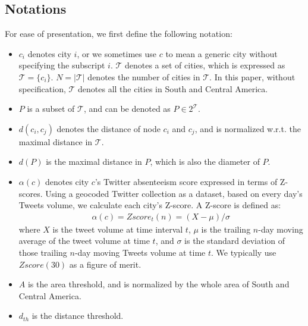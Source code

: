 \subsection{Notations}
For ease of presentation, we first define the following notation:
\begin{itemize}
\item $c_i$ denotes city $i$, or we sometimes
use $c$ to mean a generic city without specifying the subscript $i$. $\mathcal{T}$ denotes
a set of cities, which is expressed as $\mathcal{T}=\{c_i\}$. $N=|\mathcal{T}|$ denotes
the number of cities in $\mathcal{T}$. In this paper, without specification, $\mathcal{T}$ denotes
all the cities in South and Central America.
\item $P$ is a subset of $\mathcal{T}$, and can be denoted as $P\in 2^{\mathcal{T}}$.
\item $d(c_i,c_j)$ denotes the distance of node $c_i$ and $c_j$, and is normalized w.r.t. the maximal distance in $\mathcal{T}$.
\item $d(P)$ is the maximal distance in $P$, which is also the diameter of $P$.
\item $\alpha(c)$ denotes city $c$'s Twitter absenteeism score expressed in terms
of Z-scores.
Using a geocoded Twitter collection as a dataset, based on every day's Tweets volume,
we calculate each city's Z-score. A Z-score is defined as:
\begin{equation}
	\label{eq:zscore}
	\begin{array}{l}
		\alpha(c)=Zscore_t(n) =(X-\mu)/{\sigma}\,
	\end{array}
\end{equation}
where $X$ is the tweet volume at time interval $t$, $\mu$ is the trailing $n$-day moving average of the
tweet volume at time $t$, and $\sigma$ is the standard deviation of those trailing $n$-day moving Tweets volume at time $t$. We typically
use $Zscore(30)$ as a figure of merit.

\item $A$ is the area threshold, and is normalized by the whole area of South and Central America.
\item $d_{th}$ is the distance threshold.
\end{itemize}


